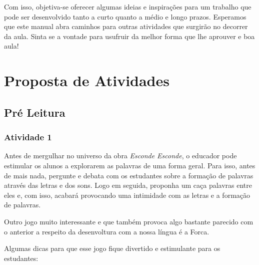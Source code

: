 \documentclass[11pt]{extarticle}
\begin{document}
Com isso, objetiva-se oferecer algumas ideias e inspirações para um trabalho que pode ser desenvolvido tanto a curto quanto a médio e longo prazos. Esperamos que este manual abra caminhos para outras atividades que surgirão no decorrer da aula. Sinta se a vontade para usufruir da melhor forma que lhe aprouver e boa aula!


\section{Proposta de Atividades}
\subsection{Pré Leitura}
\subsubsection{Atividade 1}


Antes de mergulhar no universo da obra \textit{Esconde Esconde}, o educador pode estimular os alunos a explorarem as palavras de uma forma geral. Para isso, antes de mais nada, pergunte e debata com os estudantes sobre a formação de palavras através das letras e dos sons. Logo em seguida, proponha um caça palavras entre eles e, com isso, acabará provocando uma intimidade com as letras e a formação de palavras. 


Outro jogo muito interessante e que também provoca algo bastante parecido com o anterior a respeito da desenvoltura com a nossa língua é a Forca. 

Algumas dicas para que esse jogo fique divertido e estimulante para os estudantes: 
\end{document}
